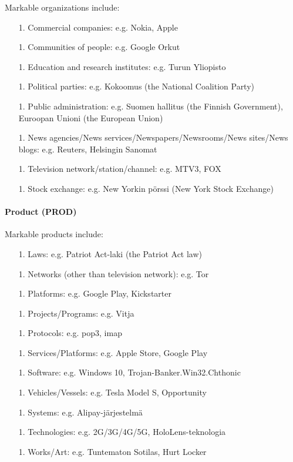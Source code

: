 \documentclass[11pt]{article}
\begin{document}
Markable organizations include:

\begin{itemize}

\item[1.] Commercial companies: e.g. Nokia, Apple
\item[1.] Communities of people: e.g. Google Orkut
\item[1.] Education and research institutes: e.g. Turun Yliopisto
\item[1.] Political parties: e.g. Kokoomus (the National Coalition Party)
\item[1.] Public administration: e.g. Suomen hallitus (the Finnish Government), Euroopan Unioni (the European Union) %
\item[1.] News agencies/News services/Newspapers/Newsrooms/News sites/News blogs: e.g. Reuters, Helsingin Sanomat
\item[1.] Television network/station/channel: e.g. MTV3, FOX
\item[1.] Stock exchange: e.g. New Yorkin p\"orssi (New York Stock Exchange)

\end{itemize}


\paragraph{Product (PROD)}

Markable products include:

\begin{itemize}

\item[1.] Laws: e.g. Patriot Act-laki (the Patriot Act law)
\item[1.] Networks (other than television network): e.g. Tor
\item[1.] Platforms: e.g. Google Play, Kickstarter
\item[1.] Projects/Programs: e.g. Vitja
\item[1.] Protocols: e.g. pop3, imap
\item[1.] Services/Platforms: e.g. Apple Store, Google Play
\item[1.] Software: e.g. Windows 10, Trojan-Banker.Win32.Chthonic
\item[1.] Vehicles/Vessels: e.g. Tesla Model S, Opportunity
\item[1.] Systems: e.g. Alipay-j\"arjestelm\"a
\item[1.] Technologies: e.g. 2G/3G/4G/5G, HoloLens-teknologia
\item[1.] Works/Art: e.g. Tuntematon Sotilas, Hurt Locker
 
\end{itemize}
\end{document}
